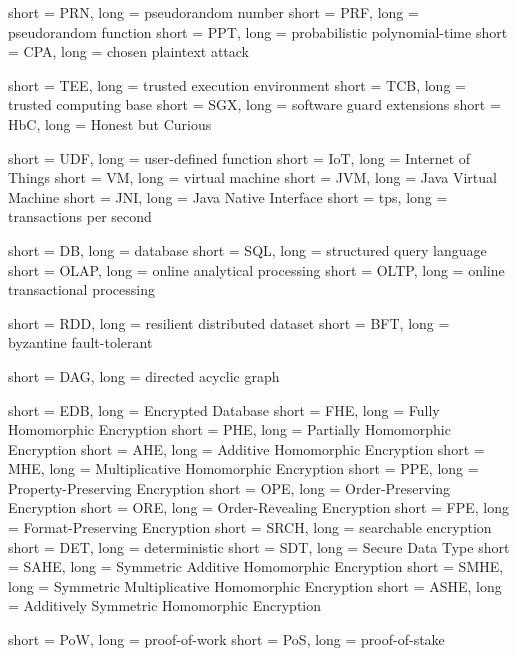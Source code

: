  {
	short = PRN,
	long = pseudorandom number
}
 {
	short = PRF,
	long = pseudorandom function
}
 {
	short = PPT,
	long = probabilistic polynomial-time
}
 {
	short = CPA,
	long = chosen plaintext attack
}

 {
	short = TEE,
	long = trusted execution environment
}
 {
	short = TCB,
	long = trusted computing base
}
 {
	short = SGX,
	long = software guard extensions
}
 {
	short = HbC,
	long = Honest but Curious
}

 {
	short = UDF,
	long = user-defined function
}
 {
	short = IoT,
	long = Internet of Things
}
 {
	short = VM,
	long = virtual machine
}
 {
	short = JVM,
	long = Java Virtual Machine
}
 {
	short = JNI,
	long = Java Native Interface
}
 {
	short = tps,
	long = transactions per second
}

 {
	short = DB,
	long = database
}
 {
	short = SQL,
	long = structured query language
}
 {
	short = OLAP,
	long = online analytical processing
}
 {
	short = OLTP,
	long = online transactional processing
}

 {
	short = RDD,
	long = resilient distributed dataset
}
 {
	short = BFT,
	long = byzantine fault-tolerant
}

 {
	short = DAG,
	long = directed acyclic graph
}

 {
	short = EDB,
	long = Encrypted Database
}
 {
	short = FHE,
	long = Fully Homomorphic Encryption
}
 {
	short = PHE,
	long = Partially Homomorphic Encryption
}
 {
	short = AHE,
	long = Additive Homomorphic Encryption
}
 {
	short = MHE,
	long = Multiplicative Homomorphic Encryption
}
 {
	short = PPE,
	long = Property-Preserving Encryption
}
 {
	short = OPE,
	long = Order-Preserving Encryption
}
 {
	short = ORE,
	long = Order-Revealing Encryption
}
 {
	short = FPE,
	long = Format-Preserving Encryption
}
 {
	short = SRCH,
	long = searchable encryption
}
 {
	short = DET,
	long = deterministic
}
 {
	short = SDT,
	long = Secure Data Type
}
 {
	short = SAHE,
	long = Symmetric Additive Homomorphic Encryption
}
 {
	short = SMHE,
	long = Symmetric Multiplicative Homomorphic Encryption
}
 {
	short = ASHE,
	long = Additively Symmetric Homomorphic Encryption
}

 {
	short = PoW,
	long = proof-of-work
}
 {
	short = PoS,
	long = proof-of-stake
}
